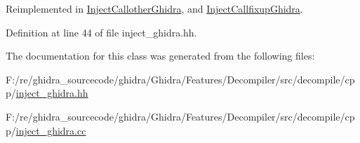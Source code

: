 Reimplemented in \mbox{\hyperlink{class_inject_callother_ghidra_a2b2c94c0e13627b5b0eeaa54d52aaeee}{Inject\+Callother\+Ghidra}}, and \mbox{\hyperlink{class_inject_callfixup_ghidra_aa37f8393c5bd7ca6ef68220b278acd19}{Inject\+Callfixup\+Ghidra}}.



Definition at line 44 of file inject\+\_\+ghidra.\+hh.



The documentation for this class was generated from the following files\+:\begin{DoxyCompactItemize}
\item 
F\+:/re/ghidra\+\_\+sourcecode/ghidra/\+Ghidra/\+Features/\+Decompiler/src/decompile/cpp/\mbox{\hyperlink{inject__ghidra_8hh}{inject\+\_\+ghidra.\+hh}}\item 
F\+:/re/ghidra\+\_\+sourcecode/ghidra/\+Ghidra/\+Features/\+Decompiler/src/decompile/cpp/\mbox{\hyperlink{inject__ghidra_8cc}{inject\+\_\+ghidra.\+cc}}\end{DoxyCompactItemize}

